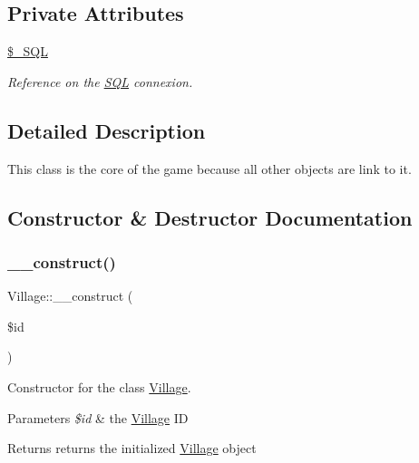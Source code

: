 \subsection*{Private Attributes}
\begin{DoxyCompactItemize}
\item 
\mbox{\label{classVillage_ac374f0115b1f1d60b8167e029c11e94d}} 
\mbox{\hyperlink{classVillage_ac374f0115b1f1d60b8167e029c11e94d}{\$\+\_\+\+S\+QL}}
\begin{DoxyCompactList}\small\item\em Reference on the \mbox{\hyperlink{classSQL}{S\+QL}} connexion. \end{DoxyCompactList}\end{DoxyCompactItemize}


\subsection{Detailed Description}
This class is the core of the game because all other objects are link to it. 

\subsection{Constructor \& Destructor Documentation}
\mbox{\label{classVillage_a2e242983f34bdede6730316edccfa988}} 
\subsubsection{\texorpdfstring{\+\_\+\+\_\+construct()}{\_\_construct()}}
{\footnotesize\ttfamily Village\+::\+\_\+\+\_\+construct (\begin{DoxyParamCaption}\item[{}]{\$id }\end{DoxyParamCaption})}



Constructor for the class \mbox{\hyperlink{classVillage}{Village}}. 


\begin{DoxyParams}{Parameters}
{\em \$id} & the \mbox{\hyperlink{classVillage}{Village}} ID \\
\hline
\end{DoxyParams}
\begin{DoxyReturn}{Returns}
returns the initialized \mbox{\hyperlink{classVillage}{Village}} object 
\end{DoxyReturn}



